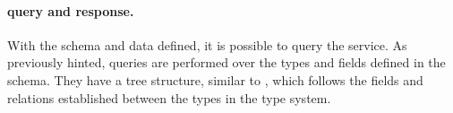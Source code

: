 




\paragraph{\gql query and response.}

With the schema and data defined, it is possible to query the service. 
As previously hinted, \gql queries are performed over the types and fields defined in the schema.
They have a tree structure, similar to \json, which follows the fields and relations established between the types
in the type system.

